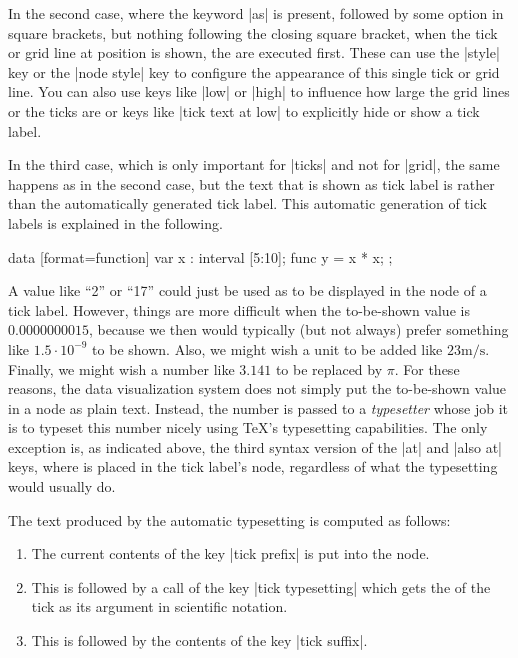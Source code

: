 In the second case, where the keyword |as| is present, followed by some option
in square brackets, but nothing following the closing square bracket, when the
tick or grid line at position  is shown, the 
are executed first. These can use the |style| key or the |node style| key to
configure the appearance of this single tick or grid line. You can also use
keys like |low| or |high| to influence how large the grid lines or the ticks
are or keys like |tick text at low| to explicitly hide or show a tick label.

In the third case, which is only important for |ticks| and not for |grid|, the
same happens as in the second case, but the text that is shown as tick label is
 rather than the automatically generated tick label. This automatic
generation of tick labels is explained in the following.
%
\begin{codeexample}[]
\tikz \datavisualization
  [scientific axes=clean,
   x axis={length=2.5cm, ticks={major at={
         5,
         6 as [style=red],
         7 as [{style=blue, low=-1em}],
         8 as [style=green] $2^3$,
         10 as ten
       }}},
   visualize as line]
  data [format=function] {
    var x : interval [5:10];
    func y = \value x * \value x;
  };
\end{codeexample}

A value like ``2'' or ``17'' could just be used as  to be displayed
in the node of a tick label. However, things are more difficult when the
to-be-shown value is $0.0000000015$, because we then would typically (but not
always) prefer something like $1.5 \cdot 10^{-9}$ to be shown. Also, we might
wish a unit to be added like $23\mathrm{m}/\mathrm{s}$. Finally, we might wish
a number like $3.141$ to be replaced by $\pi$. For these reasons, the data
visualization system does not simply put the to-be-shown value in a node as
plain text. Instead, the number is passed to a \emph{typesetter} whose job it
is to typeset this number nicely using \TeX's typesetting capabilities. The
only exception is, as indicated above, the third syntax version of the |at| and
|also at| keys, where  is placed in the tick label's node,
regardless of what the typesetting would usually do.

The text produced by the automatic typesetting is computed as follows:
%
\begin{enumerate}
    \item The current contents of the key |tick prefix| is put into the node.
    \item This is followed by a call of the key |tick typesetting| which gets
        the  of the tick as its argument in scientific notation.
    \item This is followed by the contents of the key |tick suffix|.
\end{enumerate}

